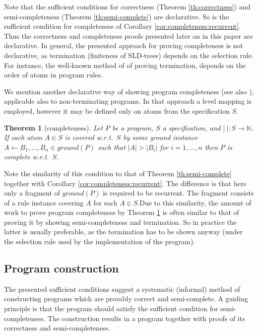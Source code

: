 \documentclass{tlp}
\newtheorem{theorem}{Theorem}
\newcommand*{\seq}[2][n]  {{#2_{1}, \allowbreak \ldots, \allowbreak #2_{#1}}}
\newcommand*{\NN}{{\ensuremath{\mathbb{N}}}\xspace}
\begin{document}
Note that the sufficient conditions for correctness (Theorem \ref{th:correctness})
and semi-completeness (Theorem \ref{th:semi-complete}) are declarative.  So is
the sufficient condition for completeness of Corollary
\ref{cor:completeness:recurrent}.
Thus the correctness and completeness proofs presented later on in this paper
are declarative. 
In general, the presented approach for proving completeness is not declarative,
as termination (finiteness of SLD-trees) depends on the selection rule.
For instance, the well-known method of  of proving termination,
depends on the order of atoms in program rules.
{\sloppy\par}

We mention another declarative way of showing program
completeness \cite{Deransart.Maluszynski93}
(see also \cite{drabent.tocl16}),
applicable also to non-terminating programs.
In that approach a level mapping is employed, however it may be defined only
on atoms 
from the specification $S$.
\begin{theorem}
[completeness]
\label{th:completenessDeransart}
Let $P$ be a program, $S$ a specification, and $|\ |\colon S\to \NN$.
If each atom $A\in S$ is covered w.r.t.\ $S$ by some ground
instance $A\gets\seq B \in ground(P)$ such that 
$|A|> |B_i|$ for $i=1,\ldots,n$
then $P$ is complete w.r.t.\ $S$.
  
\end{theorem}



Note the similarity of this condition to that of Theorem \ref{th:semi-complete}
together with  Corollary \ref{cor:completeness:recurrent}.
The difference is that here only a fragment of $ground(P)$ is required to be
recurrent.  The fragment consists of a rule instance covering $A$ for each
$A\in S$.\linebreak[3]
Due to this similarity, the amount of work to prove program completeness by 
Theorem \ref{th:completenessDeransart}
is often similar to that of proving it 
by showing semi-completeness and termination.
So in practice the latter is usually preferable, as the termination 
has to be shown anyway
(under the selection rule used by the implementation of the program).









\subsection{Program construction}
\label{sec:construction}
The presented sufficient conditions suggest a systematic (informal) method
of constructing programs which are provably correct and semi-complete.
A guiding principle is that the program should satisfy the sufficient
condition for semi-completeness.
The construction results in a program together with proofs of its
correctness and semi-completeness.
\end{document}
